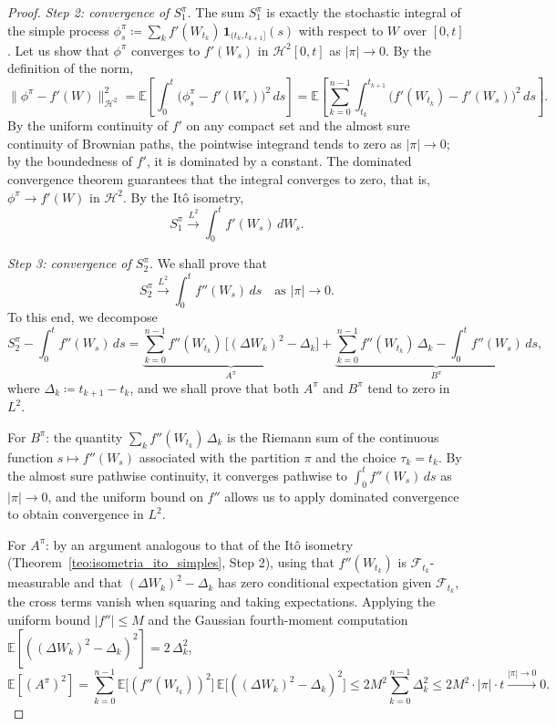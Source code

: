 \documentclass[11pt,a4paper,oneside]{report}
\theoremstyle{plain}
\theoremstyle{definition}
\theoremstyle{remark}
\newcommand{\E}{\mathbb{E}}
\newcommand{\F}{\mathcal{F}}
\newcommand{\1}{\mathbf{1}}
\newcommand{\eqdef}{\coloneqq}
\begin{document}
\begin{proof}
\emph{Step 2: convergence of $S_1^\pi$.} The sum $S_1^\pi$ is exactly
the stochastic integral of the simple process
$\phi^\pi_s \eqdef \sum_k f'(W_{t_k})\, \mathbf{1}_{(t_k, t_{k+1}]}(s)$
with respect to $W$ over $[0, t]$. Let us show that $\phi^\pi$
converges to $f'(W_s)$ in $\mathcal{H}^2[0, t]$ as $|\pi| \to 0$. By
the definition of the norm,
\begin{equation*}
  \|\phi^\pi - f'(W)\|_{\mathcal{H}^2}^2
  = \E\!\left[\int_0^t \bigl(\phi^\pi_s - f'(W_s)\bigr)^{\!2}\, ds\right]
  = \E\!\left[\sum_{k=0}^{n-1} \int_{t_k}^{t_{k+1}}
             \bigl(f'(W_{t_k}) - f'(W_s)\bigr)^{\!2}\, ds\right].
\end{equation*}
By the uniform continuity of $f'$ on any compact set and the almost
sure continuity of Brownian paths, the pointwise integrand tends to
zero as $|\pi| \to 0$; by the boundedness of $f'$, it is dominated by
a constant. The dominated convergence theorem guarantees that the
integral converges to zero, that is, $\phi^\pi \to f'(W)$ in
$\mathcal{H}^2$. By the Itô isometry,
\begin{equation*}
  S_1^\pi \xrightarrow{L^2} \int_0^t f'(W_s)\, dW_s.
\end{equation*}

\emph{Step 3: convergence of $S_2^\pi$.} We shall prove that
\begin{equation*}
  S_2^\pi \xrightarrow{L^2} \int_0^t f''(W_s)\, ds
  \quad \text{as } |\pi| \to 0.
\end{equation*}
To this end, we decompose
\begin{equation*}
  S_2^\pi - \int_0^t f''(W_s)\, ds
  = \underbrace{\sum_{k=0}^{n-1} f''(W_{t_k})\,
                \bigl[(\Delta W_k)^2 - \Delta_k\bigr]}_{A^\pi}
  + \underbrace{\sum_{k=0}^{n-1} f''(W_{t_k})\, \Delta_k
              - \int_0^t f''(W_s)\, ds}_{B^\pi},
\end{equation*}
where $\Delta_k \eqdef t_{k+1} - t_k$, and we shall prove that both
$A^\pi$ and $B^\pi$ tend to zero in $L^2$.

For $B^\pi$: the quantity $\sum_k f''(W_{t_k})\, \Delta_k$ is the
Riemann sum of the continuous function $s \mapsto f''(W_s)$
associated with the partition $\pi$ and the choice $\tau_k = t_k$. By
the almost sure pathwise continuity, it converges pathwise to
$\int_0^t f''(W_s)\, ds$ as $|\pi| \to 0$, and the uniform bound on
$f''$ allows us to apply dominated convergence to obtain convergence
in $L^2$.

For $A^\pi$: by an argument analogous to that of the Itô isometry
(Theorem~\ref{teo:isometria_ito_simples}, Step 2), using that
$f''(W_{t_k})$ is $\F_{t_k}$-measurable and that
$(\Delta W_k)^2 - \Delta_k$ has zero conditional expectation given
$\F_{t_k}$, the cross terms vanish when squaring and taking
expectations. Applying the uniform bound $|f''| \leq M$ and the
Gaussian fourth-moment computation
$\E[((\Delta W_k)^2 - \Delta_k)^2] = 2\, \Delta_k^2$,
\begin{equation*}
  \E[(A^\pi)^2]
  = \sum_{k=0}^{n-1} \E\bigl[(f''(W_{t_k}))^2\bigr]\,
    \E\bigl[((\Delta W_k)^2 - \Delta_k)^2\bigr]
  \leq 2 M^2 \sum_{k=0}^{n-1} \Delta_k^2
  \leq 2 M^2 \cdot |\pi| \cdot t \xrightarrow{|\pi| \to 0} 0.
\end{equation*}


\end{proof}
\end{document}
